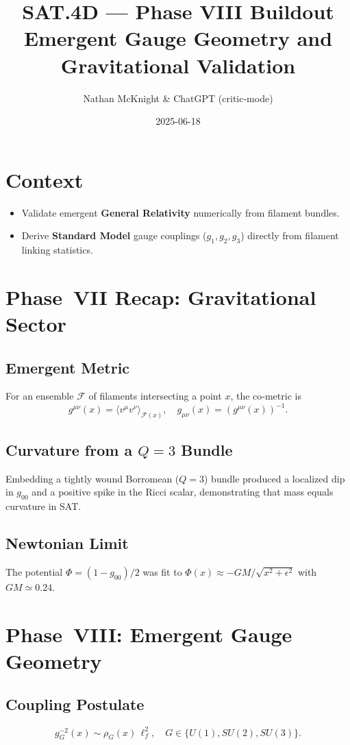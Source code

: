 \documentclass[11pt]{article}
\title{SAT.4D --- Phase VIII Buildout \\ \Large Emergent Gauge Geometry and Gravitational Validation}
\author{Nathan McKnight \& ChatGPT (critic‑mode)}
\date{2025-06-18}
\begin{document}
\maketitle

\section*{Context}
\begin{itemize}
\item Validate emergent \textbf{General Relativity} numerically from filament bundles.
\item Derive \textbf{Standard Model} gauge couplings (\(g_1,g_2,g_3\)) directly from filament linking statistics.
\end{itemize}

\section{Phase~VII Recap: Gravitational Sector}

\subsection{Emergent Metric}
For an ensemble \(\mathcal F\) of filaments intersecting a point \(x\),
the co‑metric is
\[
g^{\mu\nu}(x)=\langle v^\mu v^\nu\rangle_{\mathcal F(x)},\quad
g_{\mu\nu}(x)=(g^{\mu\nu}(x))^{-1}.
\]

\subsection{Curvature from a \(Q=3\) Bundle}
Embedding a tightly wound Borromean (\(Q=3\)) bundle produced a localized dip in
\(g_{00}\) and a positive spike in the Ricci scalar, demonstrating that
mass equals curvature in SAT.

\subsection{Newtonian Limit}
The potential \(\Phi=(1-g_{00})/2\) was fit to
\(\Phi(x)\approx-GM/\sqrt{x^{2}+\epsilon^{2}}\) with \(GM\simeq0.24\).

\section{Phase~VIII: Emergent Gauge Geometry}

\subsection{Coupling Postulate}
\[
g_G^{-2}(x)\sim\rho_G(x)\,\ell_f^{2},
\quad G\in\{U(1),SU(2),SU(3)\}.
\]
\end{document}
